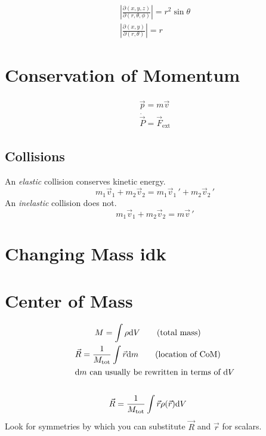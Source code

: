 \documentclass{cheatsheet}
\begin{document}
	\begin{gather*}
		\left|\frac{\partial(x,y,z)}{\partial(r,\theta,\phi)}\right| = r^2 \sin \theta \\
		\left| \frac{\partial(x,y)}{\partial(r,\theta)} \right| = r
	\end{gather*}

	\section{Conservation of Momentum}
	\begin{gather}
		\vec p = m\vec v	\tag{momentum}\\
		\dot{\vec P} = \vec F_\mathrm{ext} \tag{3rd law}
	\end{gather}
	\subsection{Collisions}
		An \emph{elastic} collision conserves kinetic energy.
		\[
			m_1\vec v_1 + m_2\vec v_2 = m_1\vec v_1\,' + m_2\vec v_2\,'
		\]
		An \emph{inelastic} collision does not.
		\[
			m_1\vec v_1 + m_2\vec v_2 = m\vec v\,'
		\]
	\section{Changing Mass idk}
	\section{Center of Mass}
	\begin{gather*}
		M = \int \rho \mathrm{d}V	\tag{total mass}\\
		\vec R =  \frac{1}{M_\mathrm{tot}}  \int \vec r \mathrm{d}m \tag{location of CoM}\raisetag{-6pt}\\
	\intertext{$\mathrm{d}m$ can usually be rewritten in terms of $\mathrm{d}V$}\\
		\vec R = \frac{1}{M_\mathrm{tot}} \int \vec r \rho(\vec r) \mathrm{d}V
	\end{gather*}
	Look for symmetries by which you can substitute $\vec R$ and $\vec r$ for scalars.
\end{document}
